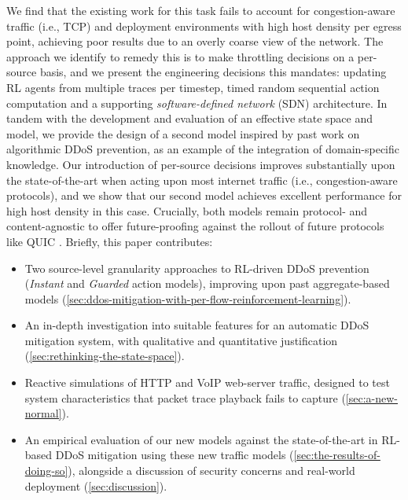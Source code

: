 \documentclass[10pt, times, conference, letterpaper]{IEEEtran}
\begin{document}
We find that the existing work for this task fails to account for congestion-aware traffic (i.e., TCP) and deployment environments with high host density per egress point, achieving poor results due to an overly coarse view of the network.
The approach we identify to remedy this is to make throttling decisions on a per-source basis, and we present the engineering decisions this mandates: updating RL agents from multiple traces per timestep, timed random sequential action computation and a supporting \emph{software-defined network} (SDN) architecture.
In tandem with the development and evaluation of an effective state space and model, we provide the design of a second model inspired by past work on algorithmic DDoS prevention, as an example of the integration of domain-specific knowledge.
Our introduction of per-source decisions improves substantially upon the state-of-the-art when acting upon most internet traffic (i.e., congestion-aware protocols), and we show that our second model achieves excellent performance for high host density in this case.
Crucially, both models remain protocol- and content-agnostic to offer future-proofing against the rollout of future protocols like QUIC \cite{DBLP:conf/sigcomm/LangleyRWVKZYKS17}.
Briefly, this paper contributes:
\begin{itemize}
	\item Two source-level granularity approaches to RL-driven DDoS prevention (\emph{Instant} and \emph{Guarded} action models), improving upon past aggregate-based models (\cref{sec:ddos-mitigation-with-per-flow-reinforcement-learning}).
	\item An in-depth investigation into suitable features for an automatic DDoS mitigation system, with qualitative and quantitative justification (\cref{sec:rethinking-the-state-space}).
	\item Reactive simulations of HTTP and VoIP web-server traffic, designed to test system characteristics that packet trace playback fails to capture (\cref{sec:a-new-normal}).
	\item An empirical evaluation of our new models against the state-of-the-art in RL-based DDoS mitigation using these new traffic models (\cref{sec:the-results-of-doing-so}), alongside a discussion of security concerns and real-world deployment (\cref{sec:discussion}).
\end{itemize}
\end{document}
